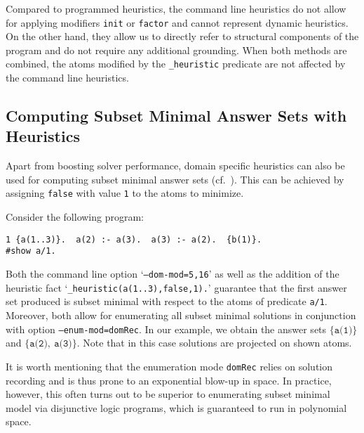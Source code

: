 Compared to programmed heuristics,
the command line heuristics do not allow for applying modifiers \texttt{init} or \texttt{factor}
and cannot represent dynamic heuristics.
On the other hand, they allow us to directly refer to structural components of the program
and do not require any additional grounding.
%
When both methods are combined,
the atoms modified by the \texttt{\_heuristic} predicate are not affected by the command line heuristics.

\subsection{Computing Subset Minimal Answer Sets with Heuristics}

Apart from boosting solver performance,
domain specific heuristics can also be used for computing subset minimal answer sets
(cf.\ \cite{cacacale96a,rogima10a}).
This can be achieved by assigning \texttt{false} with value \texttt{1} to the atoms to minimize. %
\begin{example}
Consider the following program:
\begin{lstlisting}[numbers=none]
1 {a(1..3)}.  a(2) :- a(3).  a(3) :- a(2).  {b(1)}.  
#show a/1.
\end{lstlisting}
Both the command line option `\texttt{--dom-mod=5,16}' as well as the addition of the heuristic fact
`\lstinline{_heuristic(a(1..3),false,1).}'
guarantee that the first answer set produced is subset minimal with respect to the atoms of predicate \texttt{a/1}.
Moreover, both allow for enumerating all subset minimal solutions in conjunction with option \texttt{--enum-mod=domRec}.
In our example, we obtain the answer sets
\(
\{\texttt{a(1)}\}
\)
and
\(
\{\texttt{a(2)},\ \texttt{a(3)}\}
\).
Note that in this case solutions are projected on shown atoms.
\end{example}
It is worth mentioning that the enumeration mode \texttt{domRec} relies on solution recording and is thus prone to an exponential blow-up in space.
In practice, however, this often turns out to be superior to enumerating subset minimal model via disjunctive logic programs,
which is guaranteed to run in polynomial space.

